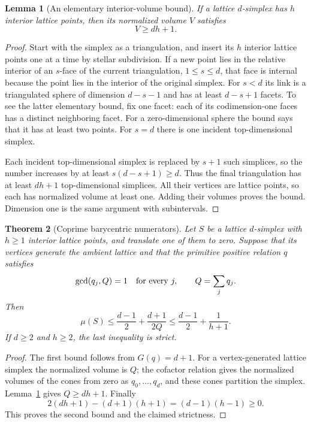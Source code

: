 \documentclass[11pt,a4paper]{article}
\newtheorem{theorem}{Theorem}[section]
\newtheorem{lemma}[theorem]{Lemma}
\theoremstyle{remark}\newtheorem{remark}[theorem]{Remark}
\begin{document}
\begin{lemma}[An elementary interior-volume bound]\label{cr6d:volume}
If a lattice $d$-simplex has $h$ interior lattice points, then
its normalized volume $V$ satisfies
\[
 V\ge dh+1.
\]
\end{lemma}
\begin{proof}
Start with the simplex as a triangulation, and insert its $h$
interior lattice points one at a time by stellar subdivision.
If a new point lies in the relative interior of an $s$-face of
the current triangulation, $1\le s\le d$, that face is internal
because the point lies in the interior of the original simplex.
For $s<d$ its link is a triangulated sphere of dimension
$d-s-1$ and has at least $d-s+1$ facets.  To see the latter
elementary bound, fix one facet: each of its codimension-one
faces has a distinct neighboring facet.  For a zero-dimensional
sphere the bound says that it has at least two points.
For $s=d$ there is one incident top-dimensional simplex.

Each incident top-dimensional simplex is replaced by $s+1$
such simplices, so the number increases by at least
$s(d-s+1)\ge d$.  Thus the final triangulation has at least
$dh+1$ top-dimensional simplices.  All their vertices are
lattice points, so each has normalized volume at least one.
Adding their volumes proves the bound.  Dimension one is the
same argument with subintervals.
\end{proof}

\begin{theorem}[Coprime barycentric numerators]\label{cr6d:coprime}
Let $S$ be a lattice $d$-simplex with $h\ge1$ interior lattice
points, and translate one of them to zero.  Suppose that its
vertices generate the ambient lattice and that the primitive
positive relation $q$ satisfies
\[
 \gcd(q_j,Q)=1 \quad\hbox{for every }j,\qquad Q=\sum_jq_j.
\]
Then
\begin{equation}\label{cr6d:coprimebound}
 \mu(S)\le\frac{d-1}{2}+\frac{d+1}{2Q}
 \le\frac{d-1}{2}+\frac1{h+1}.
\end{equation}
If $d\ge2$ and $h\ge2$, the last inequality is strict.
\end{theorem}
\begin{proof}
The first bound follows from $G(q)=d+1$.
For a vertex-generated lattice simplex the normalized volume
is $Q$; the cofactor relation gives the normalized volumes of
the cones from zero as $q_0,\ldots,q_d$, and these cones
partition the simplex.  Lemma~\ref{cr6d:volume} gives
$Q\ge dh+1$.  Finally
\[
 2(dh+1)-(d+1)(h+1)=(d-1)(h-1)\ge0.
\]
This proves the second bound and the claimed strictness.
\end{proof}
\end{document}
